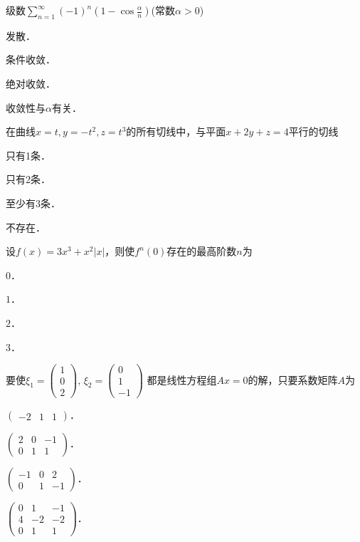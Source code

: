 \documentclass[plain,noanswer,medmath]{../../template/jnuexam}
\begin{document}
\begin{problem}
级数$\sum_{n = 1}^{\infty}(- 1)^n\left(1 - \cos \frac{\alpha}{n} \right)$(常数$\alpha > 0$) \pickout{}
\begin{abcd}
\item 发散．   
\item 条件收敛．   
\item 绝对收敛．   
\item 收敛性与$\alpha$有关．
\end{abcd}
\end{problem}


\begin{problem}
在曲线$x = t,y = - t^2,z = t^3$的所有切线中，与平面$x + 2y + z = 4$平行的切线 \pickout{}
\begin{abcd}
\item 只有1条．    
\item 只有2条．    
\item 至少有3条．    
\item 不存在．
\end{abcd}
\end{problem}


\begin{problem}
设$f(x) = 3x^3 + x^2|x|$，则使$f^n(0)$存在的最高阶数$n$为 \pickout{}
\begin{abcd}
\item $0$．          
\item $1$．          
\item $2$．          
\item $3$．
\end{abcd}
\end{problem}


\begin{problem}
要使$\xi_1=\begin{pmatrix}1 \\ 0 \\ 2\end{pmatrix}$, $\xi_2=\begin{pmatrix}0 \\ 1 \\ -1\end{pmatrix}$
都是线性方程组$Ax=0$的解，只要系数矩阵$A$为\pickout{}
\begin{abcd}
\item $\begin{pmatrix}-2 & 1 &  1\end{pmatrix}$．					
\item $\begin{pmatrix} 2 & 0 & -1 \\ 0 &  1 &  1\end{pmatrix}$．
\item $\begin{pmatrix}-1 & 0 &  2 \\ 0 &  1 & -1\end{pmatrix}$．					
\item $\begin{pmatrix} 0 & 1 & -1 \\ 4 & -2 & -2 \\ 0 & 1 & 1\end{pmatrix}$．
\end{abcd}
\end{problem}
\end{document}
